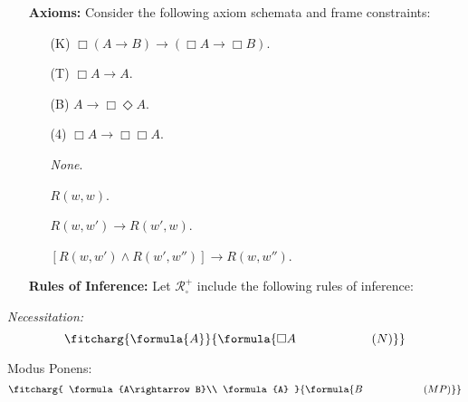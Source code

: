 \documentclass[a4paper, 11pt]{article} %
\begin{document}
\begin{enumerate}[leftmargin=1.2in,labelsep=.15in] %
\item[\bf Axioms:] Consider the following axiom schemata and frame constraints:\vspace{-.05in}
	\begin{multicols}{2}
	\begin{enumerate}
	\item[(K)] $\Box(A\rightarrow B)\rightarrow(\Box A\rightarrow\Box B)$.
	\item[(T)] $\Box A\rightarrow A$.
	\item[(B)] $A\rightarrow\Box\Diamond A$.
	\item[(4)] $\Box A\rightarrow\Box\Box A$.
	
	\item[] \textit{None}.
	\item[] $R(w,w)$.
	\item[] $R(w,w')\rightarrow R(w',w)$.
	\item[] $[R(w,w')\wedge R(w',w'')]{\rightarrow}R(w,w'')$.
	\end{enumerate}
	\end{multicols}
\item[\bf Rules of Inference:] Let $\mathcal{R}_\square^+$ include the following rules of inference:
\end{enumerate}
	
	
\begin{multicols}{2}\it
Necessitation:\vspace{-.05in}
\begin{equation*}
\fitcharg{
\formula{A}
}{
\formula{\Box A \hspace*{.83in}(N)}
}
\end{equation*}

Modus Ponens:\vspace{-.05in}
\begin{equation*}
\fitcharg{
\formula{A\rightarrow B}\\
\formula{A}
}{
\formula{B \hspace*{.8in}(MP)}
}
\end{equation*}
\end{multicols}
\vspace{-.2in}
\end{document}
